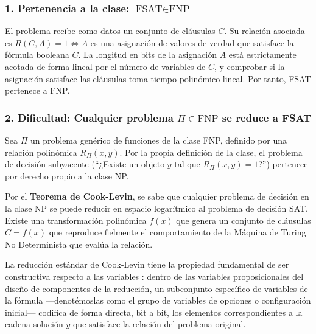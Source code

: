 \documentclass[12pt]{book} %
\begin{document}
\hypertarget{pertenencia-a-la-clase-textfsat-in-textfnp}{%
\subsubsection{\texorpdfstring{1. Pertenencia a la clase:
\(\text{FSAT} \in \text{FNP}\)}{1. Pertenencia a la clase: \textbackslash text\{FSAT\} \textbackslash in \textbackslash text\{FNP\}}}\label{pertenencia-a-la-clase-textfsat-in-textfnp}}

El problema recibe como datos un conjunto de cláusulas \(C\). Su
relación asociada es \(R(C, A) = 1 \iff A\) es una asignación de valores
de verdad que satisface la fórmula booleana \(C\). La longitud en bits
de la asignación \(A\) está estrictamente acotada de forma lineal por el
número de variables de \(C\), y comprobar si la asignación satisface las
cláusulas toma tiempo polinómico lineal. Por tanto, FSAT pertenece a
FNP.

\hypertarget{dificultad-cualquier-problema-pi-in-textfnp-se-reduce-a-fsat}{%
\subsubsection{\texorpdfstring{2. Dificultad: Cualquier problema
\(\Pi \in \text{FNP}\) se reduce a
FSAT}{2. Dificultad: Cualquier problema \textbackslash Pi \textbackslash in \textbackslash text\{FNP\} se reduce a FSAT}}\label{dificultad-cualquier-problema-pi-in-textfnp-se-reduce-a-fsat}}

Sea \(\Pi\) un problema genérico de funciones de la clase FNP, definido
por una relación polinómica \(R_{\Pi}(x, y)\). Por la propia definición
de la clase, el problema de decisión subyacente (``¿Existe un objeto
\(y\) tal que \(R_{\Pi}(x, y) = 1\)?'') pertenece por derecho propio a
la clase NP.

Por el \textbf{Teorema de Cook-Levin}, se sabe que cualquier problema de
decisión en la clase NP se puede reducir en espacio logarítmico al
problema de decisión SAT. Existe una transformación polinómica \(f(x)\)
que genera un conjunto de cláusulas \(C = f(x)\) que reproduce fielmente
el comportamiento de la Máquina de Turing No Determinista que evalúa la
relación.

La reducción estándar de Cook-Levin tiene la propiedad fundamental de
ser constructiva respecto a las variables : dentro de las variables
proposicionales del diseño de componentes de la reducción, un
subconjunto específico de variables de la fórmula ---denotémoslas como
el grupo de variables de opciones o configuración inicial--- codifica de
forma directa, bit a bit, los elementos correspondientes a la cadena
solución \(y\) que satisface la relación del problema original.
\end{document}
